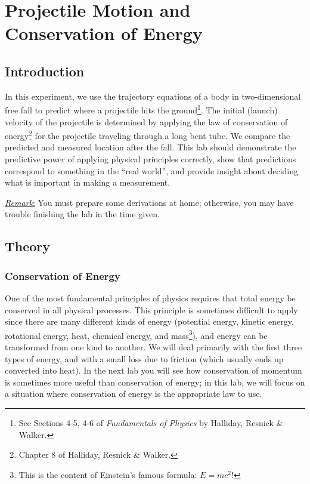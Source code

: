 \chapter{Projectile Motion and Conservation of Energy}
\label{chap:projectile}
\section{Introduction}
In this experiment, we use the trajectory equations of a body in two-dimensional free fall to predict where a projectile hits the ground\footnote{See Sections 4-5, 4-6 of \emph{Fundamentals of Physics} by Halliday, Resnick \& Walker.}. The initial (launch) velocity of the projectile is determined by applying the law of conservation of energy\footnote{Chapter 8 of Halliday, Resnick \& Walker.} for the projectile traveling through a long bent tube. We compare the predicted and measured location after the fall. This lab should demonstrate the predictive power of applying physical principles correctly, show that predictions correspond to something in the ``real world'', and provide insight about deciding what is important in making a measurement.\myskip

\underline{\emph{Remark}:} You must prepare some derivations at home; otherwise, you may have trouble finishing the lab in the time given.

\section{Theory}
\subsection{Conservation of Energy}
One of the most fundamental principles of physics requires that total energy be conserved in all physical processes. This principle is sometimes difficult to apply since there are many different kinds of energy (potential energy, kinetic energy, rotational energy, heat, chemical energy, and mass\footnote{This is the content of Einstein's famous formula: $E=mc^2$!}), and energy can be transformed from one kind to another. We will deal primarily with the first three types of energy, and with a small loss due to friction (which usually ends up converted into heat). In the next lab you will see how conservation of momentum is sometimes more useful than conservation of energy; in this lab, we will focus on a situation where conservation of energy is the appropriate law to use.\myskip

